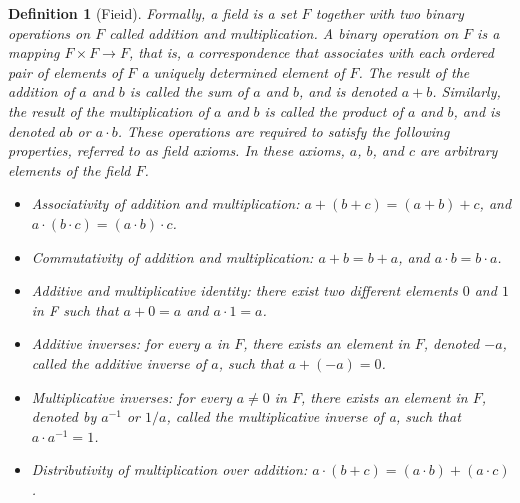 \documentclass{article}
\theoremstyle{plain}
\newtheorem*{definition1}{Definition}
\theoremstyle{plain} %
\begin{document}
\begin{definition1}[Fieid]
Formally, a field is a set $F$ together with two binary operations on $F$ called addition and multiplication. A binary operation on $F$ is a mapping $F \times  F \to  F$, that is, a correspondence that associates with each ordered pair of elements of $F$ a uniquely determined element of $F$. The result of the addition of $a$ and $b$ is called the sum of $a$ and $b$, and is denoted $a + b$. Similarly, the result of the multiplication of $a$ and $b$ is called the product of $a$ and $b$, and is denoted $ab$ or $a \cdot  b$. These operations are required to satisfy the following properties, referred to as field axioms. In these axioms, $a$, $b$, and $c$ are arbitrary elements of the field $F$.

\begin{itemize}
\item Associativity of addition and multiplication: $a + (b + c) = (a + b) + c$, and $a \cdot (b \cdot c) = (a \cdot b) \cdot c$.
\item Commutativity of addition and multiplication: $a + b = b + a$, and $a \cdot b = b \cdot a$.
\item Additive and multiplicative identity: there exist two different elements $0$ and $1$ in F such that $a + 0 = a$ and $a \cdot 1 = a$.
\item Additive inverses: for every $a$ in $F$, there exists an element in $F$, denoted $-a$, called the additive inverse of $a$, such that $a + (-a) = 0$.
\item Multiplicative inverses: for every $a \neq  0$ in $F$, there exists an element in $F$, denoted by $a^{-1}$ or $1/a$, called the multiplicative inverse of a, such that $a \cdot a^{-1} = 1$.
\item Distributivity of multiplication over addition: $a \cdot (b + c) = (a \cdot b) + (a \cdot c)$.
\end{itemize}
\end{definition1}
\end{document}
